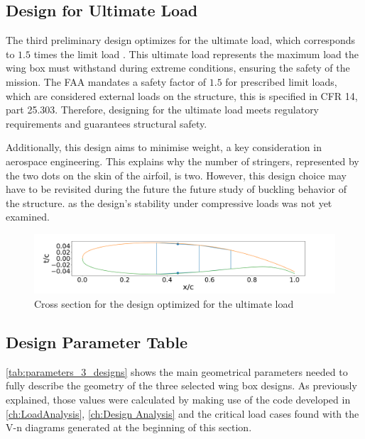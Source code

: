 \subsection*{Design for Ultimate Load}
The third preliminary design optimizes for the ultimate load, which corresponds to $1.5$ times the limit load \cite{S.Bart2023UltimateLoad}. This ultimate load represents the maximum load the wing box must withstand during extreme conditions, ensuring the safety of the mission. The FAA mandates a safety factor of $1.5$ for prescribed limit loads, which are considered external loads on the structure\cite{2023FAARegulations}, this is specified in CFR 14, part 25.303. Therefore, designing for the ultimate load meets regulatory requirements and guarantees structural safety.

\noindent Additionally, this design aims to minimise weight, a key consideration in aerospace engineering. This explains why the number of stringers, represented by the two dots on the skin of the airfoil, is two. However, this design choice may have to be revisited during the future the future study of buckling behavior of the structure. as the design's stability under compressive loads was not yet examined.

\begin{figure}[H]
    \centering
    \includegraphics[width=0.9\linewidth]{figures/Cross_section_ult_load.pdf}
    \caption{Cross section for the design optimized for the ultimate load}
    \label{fig:ult_load_design}
\end{figure}

\subsection*{Design Parameter Table}
\autoref{tab:parameters_3_designs} shows the main geometrical parameters needed to fully describe the geometry of the three selected wing box designs. As previously explained, those values were calculated by making use of the code developed in \autoref{ch:LoadAnalysis}, \autoref{ch:Design Analysis} and the critical load cases found with the V-n diagrams generated at the beginning of this section. 

